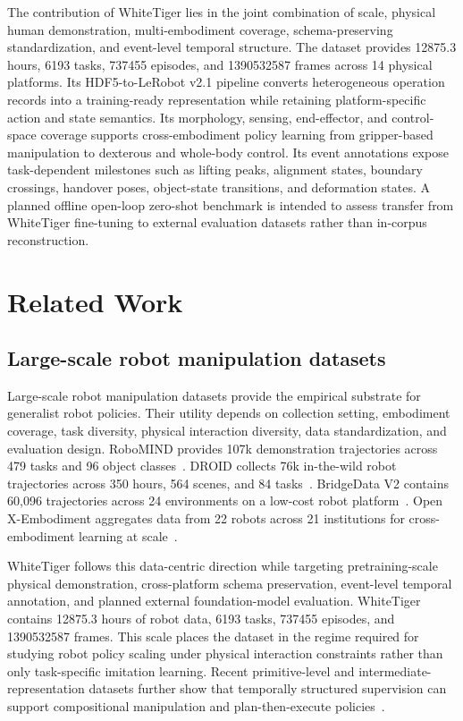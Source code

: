 The contribution of WhiteTiger lies in the joint combination of scale, physical human demonstration, multi-embodiment coverage, schema-preserving standardization, and event-level temporal structure. The dataset provides 12875.3 hours, 6193 tasks, 737455 episodes, and 1390532587 frames across 14 physical platforms. Its HDF5-to-LeRobot v2.1 pipeline converts heterogeneous operation records into a training-ready representation while retaining platform-specific action and state semantics. Its morphology, sensing, end-effector, and control-space coverage supports cross-embodiment policy learning from gripper-based manipulation to dexterous and whole-body control. Its event annotations expose task-dependent milestones such as lifting peaks, alignment states, boundary crossings, handover poses, object-state transitions, and deformation states. A planned offline open-loop zero-shot benchmark is intended to assess transfer from WhiteTiger fine-tuning to external evaluation datasets rather than in-corpus reconstruction.

\section{Related Work}

\subsection{Large-scale robot manipulation datasets}

Large-scale robot manipulation datasets provide the empirical substrate for generalist robot policies. Their utility depends on collection setting, embodiment coverage, task diversity, physical interaction diversity, data standardization, and evaluation design. RoboMIND provides 107k demonstration trajectories across 479 tasks and 96 object classes~\cite{wu2024robomind}. DROID collects 76k in-the-wild robot trajectories across 350 hours, 564 scenes, and 84 tasks~\cite{khazatsky2024droid}. BridgeData V2 contains 60,096 trajectories across 24 environments on a low-cost robot platform~\cite{walke2023bridgedatav2}. Open X-Embodiment aggregates data from 22 robots across 21 institutions for cross-embodiment learning at scale~\cite{oneill2023openx}.

WhiteTiger follows this data-centric direction while targeting pretraining-scale physical demonstration, cross-platform schema preservation, event-level temporal annotation, and planned external foundation-model evaluation. WhiteTiger contains 12875.3 hours of robot data, 6193 tasks, 737455 episodes, and 1390532587 frames. This scale places the dataset in the regime required for studying robot policy scaling under physical interaction constraints rather than only task-specific imitation learning. Recent primitive-level and intermediate-representation datasets further show that temporally structured supervision can support compositional manipulation and plan-then-execute policies~\cite{chen2024rh20tp,li2026robointer,stanovcic2026atlas}.

